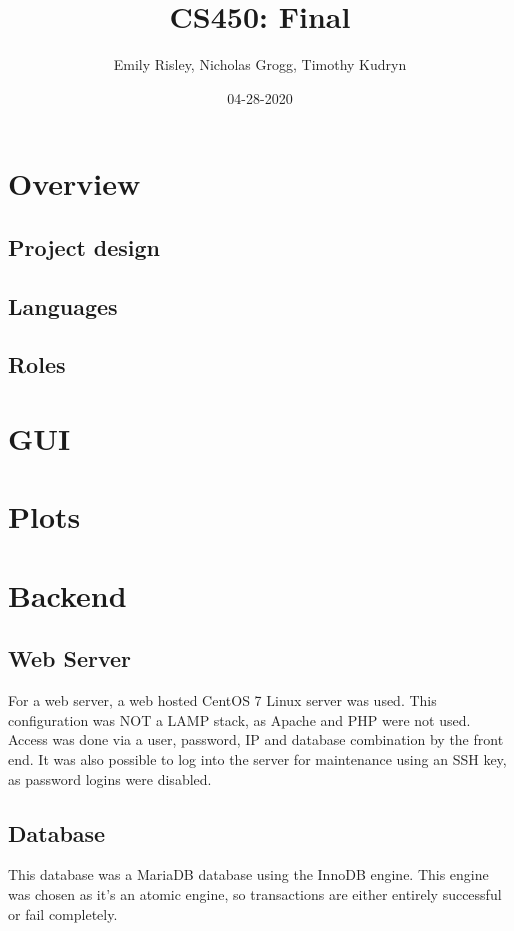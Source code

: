 \documentclass{article}
\title{CS450: Final }
\author{Emily Risley, Nicholas Grogg, Timothy Kudryn}
\date{04-28-2020}
\begin{document}
\maketitle

\section{Overview}

\subsection{Project design}

\subsection{Languages}

\subsection{Roles}

\section{GUI}

\section{Plots}

\section{Backend}
\subsection{Web Server}
\noindent
For a web server, a web hosted CentOS 7 Linux server was used. This configuration was NOT a LAMP stack, as Apache and 
PHP were not used. Access was done via a user, password, IP and database combination by the front end. It was also 
possible to log into the server for maintenance using an SSH key, as password logins were disabled.

\subsection{Database}
\noindent
This database was a MariaDB database using the InnoDB engine. This engine was chosen as it's an atomic engine, so
transactions are either entirely successful or fail completely. 
\end{document}
